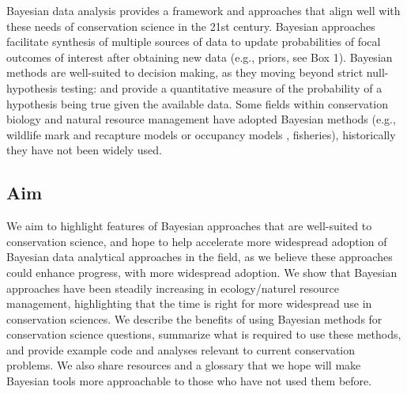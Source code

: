 \documentclass{article}
\begin{document}
\par Bayesian data analysis provides a framework and approaches that align well with these needs of conservation science in the 21st century. Bayesian approaches facilitate synthesis of multiple sources of data to update probabilities of focal outcomes of interest after obtaining new data (e.g., priors, see Box 1). Bayesian methods are well-suited to decision making, as they moving beyond strict null-hypothesis testing:
and provide a quantitative measure of the probability of a hypothesis being true given the available data. %
Some fields within conservation biology and natural resource management have adopted Bayesian methods (e.g., wildlife mark and recapture models or occupancy models \citep{}, fisheries\citep{}), historically they have not been widely used.

\subsection*{Aim} We aim to highlight features of Bayesian approaches that are well-suited to conservation science, and hope to help accelerate more widespread adoption of Bayesian data analytical approaches in the field, as we believe these approaches could enhance progress, with more  widespread adoption. We show that Bayesian approaches have been steadily increasing in ecology/naturel resource management, highlighting that the time is right for more widespread use in conservation sciences. We describe the benefits of using Bayesian methods for conservation science questions, summarize what is required to use these methods, and provide example code and analyses relevant to current conservation problems. We also share resources and a glossary that we hope will make Bayesian tools more approachable to those who have not used them before.
\end{document}
